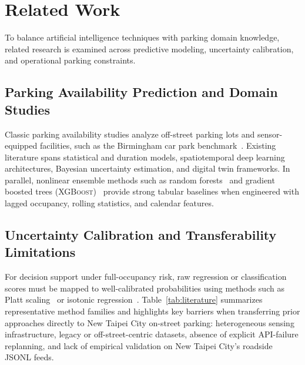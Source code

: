 \documentclass[conference,a4paper]{IEEEtran}
\begin{document}
\section{Related Work}\label{sec:related}

To balance artificial intelligence techniques with parking domain knowledge, related research is examined across predictive modeling, uncertainty calibration, and operational parking constraints.

\subsection{Parking Availability Prediction and Domain Studies}
Classic parking availability studies analyze off-street parking lots and sensor-equipped facilities, such as the Birmingham car park benchmark~\cite{stolfi2017,stolfi2017uci}. Existing literature spans statistical and duration models, spatiotemporal deep learning architectures, Bayesian uncertainty estimation, and digital twin frameworks. In parallel, nonlinear ensemble methods such as random forests~\cite{breiman2001} and gradient boosted trees (\textsc{XGBoost})~\cite{chen2016} provide strong tabular baselines when engineered with lagged occupancy, rolling statistics, and calendar features.

\subsection{Uncertainty Calibration and Transferability Limitations}
For decision support under full-occupancy risk, raw regression or classification scores must be mapped to well-calibrated probabilities using methods such as Platt scaling~\cite{platt1999} or isotonic regression~\cite{zadrozny2002}. Table~\ref{tab:literature} summarizes representative method families and highlights key barriers when transferring prior approaches directly to New Taipei City on-street parking: heterogeneous sensing infrastructure, legacy or off-street-centric datasets, absence of explicit API-failure replanning, and lack of empirical validation on New Taipei City's roadside JSONL feeds.
\end{document}
